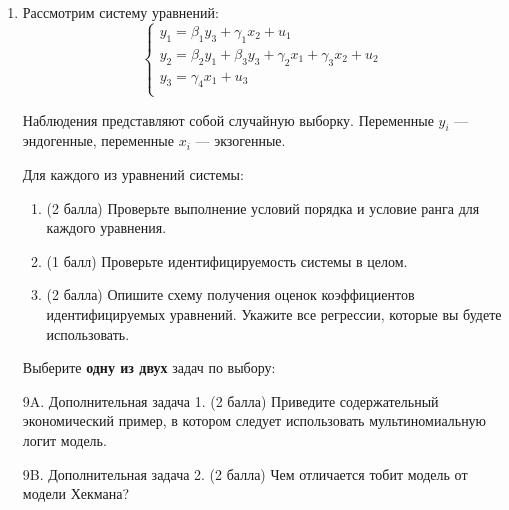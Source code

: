 \begin{enumerate}
\item Рассмотрим систему уравнений:
\[
\begin{cases}
y_1 = \beta_1 y_3 + \gamma_1 x_2 + u_1 \\
y_2 = \beta_2 y_1 + \beta_3 y_3 + \gamma_2 x_1 + \gamma_3 x_2 + u_2 \\
y_3 = \gamma_4 x_1 + u_3 \\
\end{cases}
\]

Наблюдения представляют собой случайную выборку. Переменные $y_i$ — эндогенные, переменные $x_i$ — экзогенные.

Для каждого из уравнений системы:

\begin{enumerate}
\item (2 балла) Проверьте выполнение условий порядка и условие ранга для каждого уравнения. 
\item  (1 балл) Проверьте идентифицируемость системы в целом. 
\item  (2 балла) Опишите схему получения оценок коэффициентов идентифицируемых уравнений. Укажите все регрессии, которые вы будете использовать. 

\end{enumerate}


Выберите \textbf{одну из двух} задач по выбору:

        
\item[9A.] Дополнительная задача 1. (2 балла) Приведите содержательный экономический пример, в котором следует использовать мультиномиальную логит модель.
 
\item[9B.] Дополнительная задача 2. (2 балла) Чем отличается тобит модель от модели Хекмана?
\end{enumerate}

